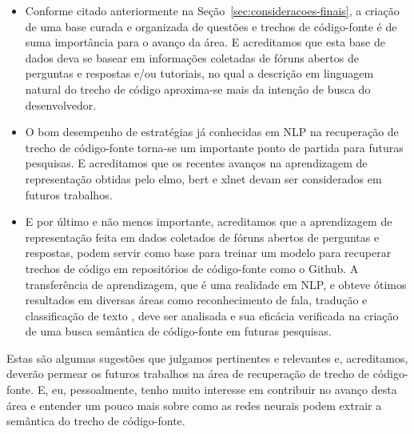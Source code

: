 \begin{itemize}
    \item Conforme citado anteriormente na Seção~\ref{sec:consideracoes-finais}, a criação de uma base curada e organizada de questões e trechos de código-fonte é de suma importância para o avanço da área. E acreditamos que esta base de dados deva se basear em informações coletadas de fóruns abertos de perguntas e respostas e/ou tutoriais, no qual a descrição em linguagem natural do trecho de código aproxima-se mais da intenção de busca do desenvolvedor.
    \item O bom desempenho de estratégias já conhecidas em NLP na recuperação de trecho de código-fonte torna-se um importante ponto de partida para futuras pesquisas. E acreditamos que os recentes avanços na aprendizagem de representação obtidas pelo \acrshort{elmo}, \acrshort{bert} e \Gls{xlnet} devam ser considerados em futuros trabalhos. 
    \item E por último e não menos importante, acreditamos que a aprendizagem de representação feita em dados coletados de fóruns abertos de perguntas e respostas, podem servir como base para treinar um modelo para recuperar trechos de código em repositórios de código-fonte como o Github. A transferência de aprendizagem, que é uma realidade em NLP, e obteve ótimos resultados em diversas áreas como reconhecimento de fala, tradução e classificação de texto \cite{devlin-etal-2019-bert}, deve ser analisada e sua eficácia verificada na criação de uma busca semântica de código-fonte em futuras pesquisas.
\end{itemize}

Estas são algumas sugestões que julgamos pertinentes e relevantes e, acreditamos, deverão permear os futuros trabalhos na área de recuperação de trecho de código-fonte. E, eu, pessoalmente, tenho muito interesse em contribuir no avanço desta área e entender um pouco mais sobre como as redes neurais podem extrair a semântica do trecho de código-fonte.